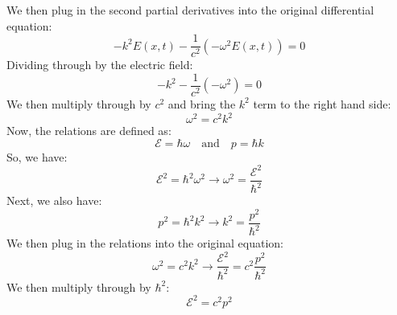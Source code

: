 \documentclass{article}
\begin{document}
We then plug in the second partial derivatives into the original differential equation:
\begin{equation}
    -k^2 E(x, t) - \frac{1}{c^2} (-\omega^2 E(x, t)) = 0
\end{equation}
Dividing through by the electric field:
\begin{equation}
    -k^2 - \frac{1}{c^2} (-\omega^2) = 0
\end{equation}
We then multiply through by $c^2$ and bring the $k^2$ term to the right hand side:
\begin{equation}
    \omega^2 = c^2 k^2
\end{equation}
Now, the relations are defined as:
\begin{equation}
    \mathcal{E} = \hbar\omega \quad \text{and} \quad p = \hbar k
\end{equation}
So, we have:
\begin{equation}
    \mathcal{E}^2 = \hbar^2 \omega^2 \rightarrow \omega^2 = \frac{\mathcal{E}^2}{\hbar^2}
\end{equation}
Next, we also have:
\begin{equation}
    p^2 = \hbar^2 k^2 \rightarrow k^2 = \frac{p^2}{\hbar^2}
\end{equation}
We then plug in the relations into the original equation:
\begin{equation}
    \omega^2 = c^2 k^2 \rightarrow \frac{\mathcal{E}^2}{\hbar^2} = c^2 \frac{p^2}{\hbar^2}
\end{equation}
We then multiply through by $\hbar^2$:
\begin{equation}
    \boxed{\mathcal{E}^2 = c^2 p^2}
\end{equation}
\end{document}

